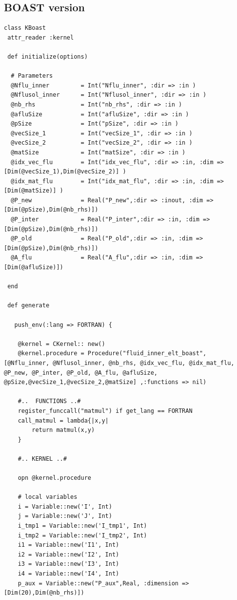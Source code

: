 \documentclass[10pt,twoside]{article}   	%
\begin{document}
\subsection{BOAST version}

\lstset{language=RUBY}
\begin{lstlisting}[caption=KBoast.rb]
class KBoast
 attr_reader :kernel

 def initialize(options)

  # Parameters 
  @Nflu_inner         = Int("Nflu_inner", :dir => :in )
  @Nflusol_inner      = Int("Nflusol_inner", :dir => :in )
  @nb_rhs             = Int("nb_rhs", :dir => :in )
  @afluSize           = Int("afluSize", :dir => :in )
  @pSize              = Int("pSize", :dir => :in )
  @vecSize_1          = Int("vecSize_1", :dir => :in )
  @vecSize_2          = Int("vecSize_2", :dir => :in )
  @matSize            = Int("matSize", :dir => :in )
  @idx_vec_flu        = Int("idx_vec_flu", :dir => :in, :dim => [Dim(@vecSize_1),Dim(@vecSize_2)] )
  @idx_mat_flu        = Int("idx_mat_flu", :dir => :in, :dim => [Dim(@matSize)] )
  @P_new              = Real("P_new",:dir => :inout, :dim => [Dim(@pSize),Dim(@nb_rhs)])
  @P_inter            = Real("P_inter",:dir => :in, :dim => [Dim(@pSize),Dim(@nb_rhs)])
  @P_old              = Real("P_old",:dir => :in, :dim => [Dim(@pSize),Dim(@nb_rhs)])
  @A_flu              = Real("A_flu",:dir => :in, :dim => [Dim(@afluSize)])

 end

 def generate

   push_env(:lang => FORTRAN) {

    @kernel = CKernel:: new()
    @kernel.procedure = Procedure("fluid_inner_elt_boast",[@Nflu_inner, @Nflusol_inner, @nb_rhs, @idx_vec_flu, @idx_mat_flu, @P_new, @P_inter, @P_old, @A_flu, @afluSize, @pSize,@vecSize_1,@vecSize_2,@matSize] ,:functions => nil)

    #..  FUNCTIONS ..#
    register_funccall("matmul") if get_lang == FORTRAN
    call_matmul = lambda{|x,y|
        return matmul(x,y)
    }

    #.. KERNEL ..#

    opn @kernel.procedure

    # local variables
    i = Variable::new('I', Int)
    j = Variable::new('J', Int)
    i_tmp1 = Variable::new('I_tmp1', Int)
    i_tmp2 = Variable::new('I_tmp2', Int)
    i1 = Variable::new('I1', Int)
    i2 = Variable::new('I2', Int)
    i3 = Variable::new('I3', Int)
    i4 = Variable::new('I4', Int)
    p_aux = Variable::new("P_aux",Real, :dimension => [Dim(20),Dim(@nb_rhs)])


\end{lstlisting}
\end{document}
